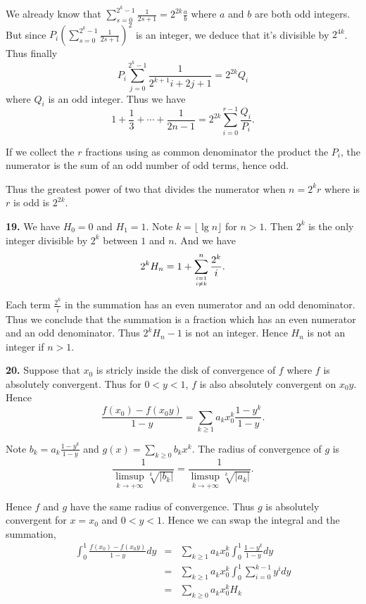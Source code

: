 \documentclass[a4paper,12pt]{article}
\newcommand{\newpar}[1]{\bigskip \noindent \textbf{#1.}}
\begin{document}
We already know that $\sum_{s=0}^{2^k-1}\frac{1}{2s+1} = 2^{2k}\frac{a}{b}$
where $a$ and $b$ are both odd integers.  But since
$P_i\left(\sum_{s=0}^{2^k-1}\frac{1}{2s+1}\right)^2$ is an integer, we
deduce that it's divisible by $2^{4k}$.  Thus finally
\[ P_i \sum_{j=0}^{2^k-1}\frac{1}{2^{k+1}i + 2j + 1} = 2^{2k}Q_i\]
where $Q_i$ is an odd integer.  Thus we have
\[ 1 + \frac{1}{3} + \cdots + \frac{1}{2n-1} = 2^{2k} \sum_{i=0}^{r-1}
\frac{Q_i}{P_i}.\]

If we collect the $r$ fractions using as common denominator the
product the $P_i$, the numerator is the sum of an odd number of odd
terms, hence odd.

Thus the greatest power of two that divides the numerator when $n =
2^k r$ where is $r$ is odd is $2^{2k}$.

\newpar{19} We have $H_0 = 0$ and $H_1 = 1$. Note $k = \lfloor \lg n
\rfloor$ for $n>1$.  Then $2^k$ is the only integer divisible by $2^k$
between $1$ and $n$.  And we have
\[  2^k H_n = 1 + \sum_{i=1\atop i\not= k}^n \frac{2^k}{i}.\]

Each term $\frac{2^k}{i}$ in the summation has an even numerator and
an odd denominator.  Thus we conclude that the summation is a fraction
which has an even numerator and an odd denominator.  Thus $2^k H_n -
1$ is not an integer.  Hence $H_n$ is not an integer if $n>1$.

\newpar{20} Suppose that $x_0$ is stricly inside the disk of
convergence of $f$ where $f$ is absolutely convergent.  Thus for
$0<y<1$, $f$ is also absolutely convergent on $x_0y$.  Hence
\[  \frac{f(x_0) - f(x_0y)}{1 - y} = \sum_{k\ge1} a_k
x_0^k\frac{1-y^k}{1-y} .\]

Note $b_k = a_k \frac{1-y^k}{1-y}$ and $g(x) = \sum_{k\ge 0}b_k
x^k$. The radius of convergence of $g$ is
\[ \frac{1}{\limsup_{k\to+\infty} \sqrt[k]{\left|b_k\right|}} =
\frac{1}{\limsup_{k \to +\infty} \sqrt[k]{\left|a_k\right|}}.\]

Hence $f$ and $g$ have the same radius of convergence.  Thus $g$ is
absolutely convergent for $x=x_0$ and $0 < y < 1$.  Hence we can swap the
integral and the summation,
\begin{eqnarray*}
  \int_0^1 \frac{f(x_0) - f(x_0y)}{1 - y}dy &=& \sum_{k\ge 1} a_k x_0^k
  \int_0^1 \frac{1-y^k}{1-y}dy \\
  &=& \sum_{k\ge 1}a_kx_0^k \int_0^1 \sum_{i=0}^{k-1} y^idy \\
  &=& \sum_{k\ge 0} a_kx_0^k H_k
\end{eqnarray*}
\end{document}
